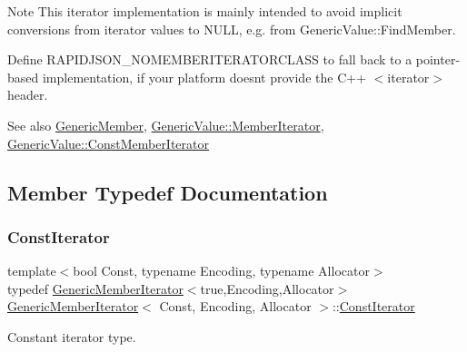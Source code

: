 \begin{DoxyNote}{Note}
This iterator implementation is mainly intended to avoid implicit conversions from iterator values to {\ttfamily N\+U\+LL}, e.\+g. from Generic\+Value\+::\+Find\+Member.

Define {\ttfamily R\+A\+P\+I\+D\+J\+S\+O\+N\+\_\+\+N\+O\+M\+E\+M\+B\+E\+R\+I\+T\+E\+R\+A\+T\+O\+R\+C\+L\+A\+SS} to fall back to a pointer-\/based implementation, if your platform doesn\textquotesingle{}t provide the C++ $<$iterator$>$ header.
\end{DoxyNote}
\begin{DoxySeeAlso}{See also}
\hyperlink{classGenericMember}{Generic\+Member}, \hyperlink{classGenericValue_a349b8faae61edc42b4289726820be439}{Generic\+Value\+::\+Member\+Iterator}, \hyperlink{classGenericValue_aac08c3e660a9036d3dcb8b10ff6c61f4}{Generic\+Value\+::\+Const\+Member\+Iterator} 
\end{DoxySeeAlso}


\subsection{Member Typedef Documentation}
\mbox{\label{classGenericMemberIterator_ae5be27a73dce0be58ee2776db896d591}} 
\subsubsection{\texorpdfstring{Const\+Iterator}{ConstIterator}}
{\footnotesize\ttfamily template$<$bool Const, typename Encoding, typename Allocator$>$ \\
typedef \hyperlink{classGenericMemberIterator}{Generic\+Member\+Iterator}$<$true,Encoding,Allocator$>$ \hyperlink{classGenericMemberIterator}{Generic\+Member\+Iterator}$<$ Const, Encoding, Allocator $>$\+::\hyperlink{classGenericMemberIterator_ae5be27a73dce0be58ee2776db896d591}{Const\+Iterator}}



Constant iterator type. 

\mbox{\label{classGenericMemberIterator_ae60bbcbaec51d36eef299996543872e6}} 
